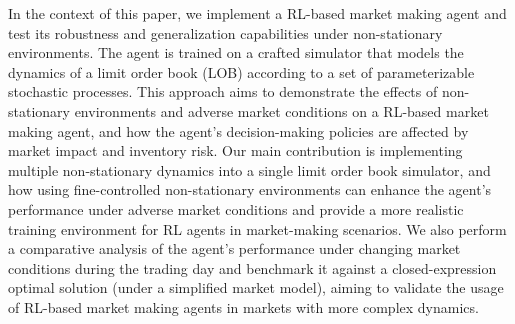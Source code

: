 In the context of this paper, we implement a RL-based market making agent and test its robustness and generalization capabilities under non-stationary environments.
The agent is trained on a crafted simulator that models the dynamics of a limit order book (LOB) according to a set of parameterizable stochastic processes.
This approach aims to demonstrate the effects of non-stationary environments and adverse market conditions on
a RL-based market making agent, and how the agent's decision-making policies are affected by market impact and inventory risk.
Our main contribution is implementing multiple non-stationary dynamics into a single limit order book simulator,
and how using fine-controlled non-stationary environments can enhance the agent's performance under adverse market conditions
and provide a more realistic training environment for RL agents in market-making scenarios.
We also perform a comparative analysis of the agent's performance under changing market conditions during the
trading day and benchmark it against a closed-expression optimal solution (under a simplified market model),
aiming to validate the usage of RL-based market making agents in markets with more complex dynamics.

